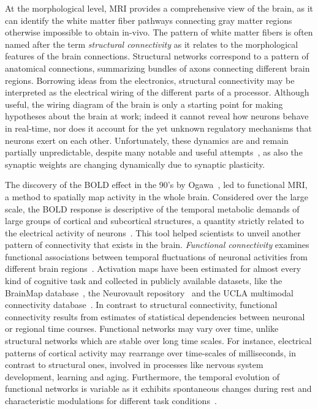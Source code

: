 \documentclass[11pt,              a4paper,              twoside,openright,              titlepage,              headinclude,footinclude,                            numbers=noenddot,              cleardoublepage=empty,]{scrreprt}
\begin{document}
At the morphological level, MRI provides a comprehensive view of the brain, as it can identify the white matter fiber pathways connecting gray matter regions otherwise impossible to obtain in-vivo.
The pattern of white matter fibers is often named after the term \emph{structural connectivity} as it relates to the morphological features of the brain connections.
Structural networks correspond to a pattern of anatomical connections, summarizing bundles of axons connecting different brain regions.
Borrowing ideas from the electronics, structural connectivity may be interpreted as the electrical wiring of the different parts of a processor.
Although useful, the wiring diagram of the brain is only a starting point for making hypotheses about the brain at work; indeed it cannot reveal how neurons behave in real-time, nor does it account for the yet unknown regulatory mechanisms that neurons exert on each other.
Unfortunately, these dynamics are and remain partially unpredictable, despite many notable and useful attempts~\cite{deco2008}, as also the synaptic weights are changing dynamically due to synaptic plasticity.

The discovery of the BOLD effect in the 90's by Ogawa~\cite{ogawa1990}, led to functional MRI, a method to spatially map activity in the whole brain.
Considered over the large scale, the BOLD response is descriptive of the temporal metabolic demands of large groups of cortical and subcortical structures, a quantity strictly related to the electrical activity of neurons~\cite{logothetis2001}.
This tool helped scientists to unveil another pattern of connectivity that exists in the brain. \emph{Functional connectivity} examines functional associations between temporal fluctuations of neuronal activities from different brain regions~\cite{biswal1995}.
Activation maps have been estimated for almost every kind of cognitive task and collected in publicly available datasets, like the BrainMap database~\cite{fox2002}, the Neurovault repository~\cite{gorgolewski2015} and the UCLA multimodal connectivity database~\cite{brown2012}.
 In contrast to structural connectivity, functional connectivity results from estimates of statistical dependencies between neuronal or regional time courses.
Functional networks may vary over time, unlike structural networks which are stable over long time scales. For instance, electrical patterns of cortical activity may rearrange over time-scales of milliseconds, in contrast to structural ones, involved in processes like nervous system development, learning and aging.
Furthermore, the temporal evolution of functional networks is variable as it exhibits spontaneous changes during rest and characteristic modulations for different task conditions~\cite{honey2007,hutchison2013}.
\end{document}
